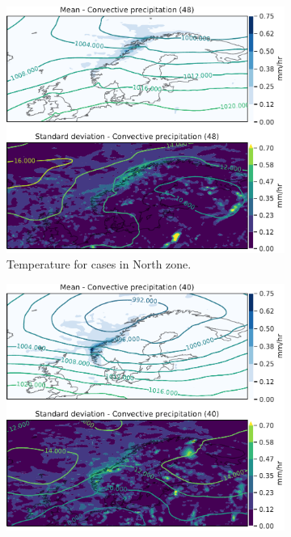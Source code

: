 \begin{figure}
\begin{subfigure}[b]{0.49\textwidth}
    \centering
    \includegraphics[width=\textwidth]{Figures/cPNord.pdf}
    \caption{Temperature for cases in North zone.}
    \label{fig:NordcP}
\end{subfigure}
\begin{subfigure}[b]{0.49\textwidth}
    \centering
    \includegraphics[width=\textwidth]{Figures/cPNordvest.pdf}

\end{subfigure}
\end{figure}
